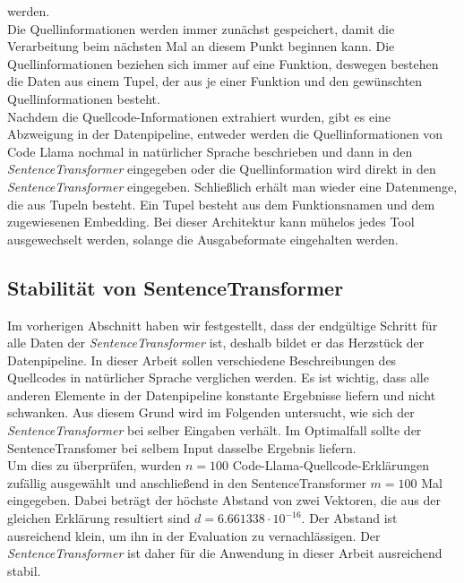 \documentclass[12pt,letterpaper,ngerman]{article}
\begin{document}
werden.\\
Die Quellinformationen werden immer zunächst gespeichert, damit die 
Verarbeitung beim nächsten Mal an diesem Punkt beginnen kann.
Die Quellinformationen beziehen sich immer auf eine Funktion,
deswegen bestehen die Daten aus einem Tupel, der aus je einer
Funktion und den gewünschten Quellinformationen besteht.\\
Nachdem die Quellcode-Informationen extrahiert wurden, 
gibt es eine Abzweigung in der Datenpipeline, entweder 
werden die Quellinformationen von Code Llama nochmal in natürlicher 
Sprache beschrieben und dann in den \textit{SentenceTransformer}
eingegeben oder die Quellinformation wird direkt in den 
\textit{SentenceTransformer} eingegeben. Schließlich erhält man
wieder eine Datenmenge, die aus Tupeln besteht. Ein Tupel besteht
aus dem Funktionsnamen und dem zugewiesenen Embedding. 
Bei dieser Architektur kann mühelos jedes Tool ausgewechselt werden,
solange die Ausgabeformate eingehalten werden. 
\subsection{Stabilität von SentenceTransformer}
Im vorherigen Abschnitt haben wir festgestellt, dass der endgültige
Schritt für alle Daten der \textit{SentenceTransformer} ist, deshalb
bildet 
er das Herzstück der Datenpipeline. In dieser Arbeit sollen 
verschiedene Beschreibungen des Quellcodes in 
natürlicher Sprache verglichen werden. Es ist wichtig, dass alle 
anderen Elemente in der Datenpipeline konstante Ergebnisse 
liefern und nicht schwanken. Aus diesem Grund wird im Folgenden 
untersucht, wie sich der \textit{SentenceTransformer} bei selber
Eingaben verhält. Im Optimalfall sollte der SentenceTransfomer bei 
selbem Input dasselbe Ergebnis liefern.\\
Um dies zu überprüfen, wurden $n = 100$ 
Code-Llama-Quellcode-Erklärungen zufällig ausgewählt und 
anschließend in
den SentenceTransformer $m = 100$ Mal eingegeben. Dabei beträgt
der höchste Abstand von zwei Vektoren,
die aus der gleichen Erklärung resultiert sind 
$d = 6.661338\cdot 10^{-16}$. Der 
Abstand ist ausreichend klein, um ihn in der Evaluation zu 
vernachlässigen. Der \textit{SentenceTransformer} ist daher
für die Anwendung in dieser Arbeit ausreichend stabil.

%
\pagebreak
\end{document}
